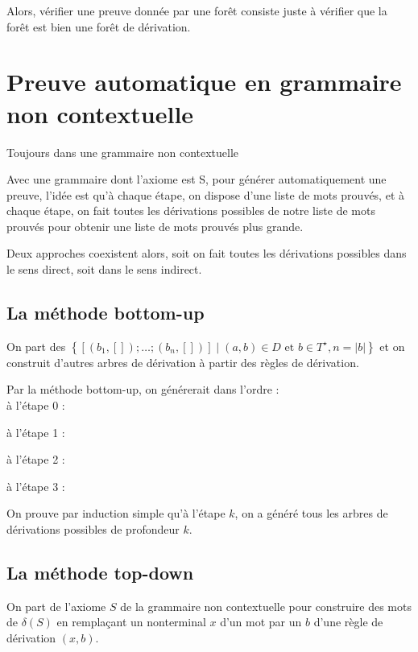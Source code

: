 \documentclass[a4paper,10pt
]{article}
\newcommand{\norm}[1]{\lvert #1 \rvert}
\begin{document}

Alors, vérifier une preuve donnée par une forêt consiste juste à vérifier que la forêt est bien une forêt de dérivation.

\section{Preuve automatique en grammaire non contextuelle}

Toujours dans une grammaire non contextuelle

Avec une grammaire dont l'axiome est S,
pour générer automatiquement une preuve, l'idée est qu'à chaque étape,
on dispose d'une liste de mots prouvés,
et à chaque étape, on fait toutes les dérivations possibles de notre liste de mots prouvés pour obtenir une liste de mots prouvés plus grande.

Deux approches coexistent alors, soit on fait toutes les dérivations possibles dans le sens direct, soit dans le sens indirect.

\subsection{La méthode bottom-up}

On part des $\left\{ [(b_1,[]);\dots;(b_n,[])] \mid (a,b)\in D \text{ et } b \in T^\star , n = \norm{b}\right\}$ et on construit d'autres arbres de dérivation à partir des règles de dérivation.

Par la méthode bottom-up, on générerait dans l'ordre :\\
à l'étape 0 :
 
à l'étape 1 : 
 
à l'étape 2 : 
 
à l'étape 3 : 
 

On prouve par induction simple qu'à l'étape $k$, on a généré tous les arbres de dérivations possibles de profondeur $k$.

\subsection{La méthode top-down}

On part de l'axiome $S$ de la grammaire non contextuelle pour construire des mots de $\delta(S)$ en remplaçant un nonterminal $x$ d'un mot par un $b$ d'une règle de dérivation $(x,b)$.
\end{document}

